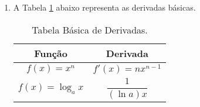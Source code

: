 \documentclass[a4paper]{article}
\begin{document}
\begin{enumerate}
\begin{center}
\begin{tabular}{|c|c|}
		\end{tabular}
	\end{center}
	
	$ \\ $
	\item A Tabela \ref{minha-tabela-01} abaixo representa as derivadas básicas.
	\begin{table}[!htb] %
	\centering
		\begin{tabular}{|c|c|} %
	
				\hline
				Função & Derivada \\ \hline
				$ f(x) = x^n $ & $ f'(x) = nx^{n-1} $ \\ \hline
				$ f(x) = \log_a x $ & $ \dfrac{1}{(\ln a)x} $ \\ \hline
	
		\end{tabular}
		\caption{Tabela Básica de Derivadas.}
		\label{minha-tabela-01}
	\end{table}

\end{enumerate}
\end{document}
